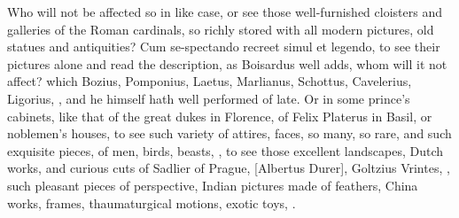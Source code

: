 {Who will not be affected so in like case, or see those well-furnished
cloisters and galleries of the Roman cardinals, so richly stored with
all modern pictures, old statues and antiquities? Cum se-spectando
recreet simul et legendo, to see their pictures alone and read the
description, as Boisardus well adds, whom will it not affect?
which Bozius, Pomponius, Laetus, Marlianus, Schottus, Cavelerius,
Ligorius, \etc{}, and he himself hath well performed of late. Or in some
prince's cabinets, like that of the great dukes in Florence, of Felix
Platerus in Basil, or noblemen's houses, to see such variety of
attires, faces, so many, so rare, and such exquisite pieces, of men,
birds, beasts, \etc{}, to see those excellent landscapes, Dutch works, and
curious cuts of Sadlier of Prague, [Albertus Durer], Goltzius Vrintes,
\etc{}, such pleasant pieces of perspective, Indian pictures made of
feathers, China works, frames, thaumaturgical motions, exotic toys, \etc{}.

}
